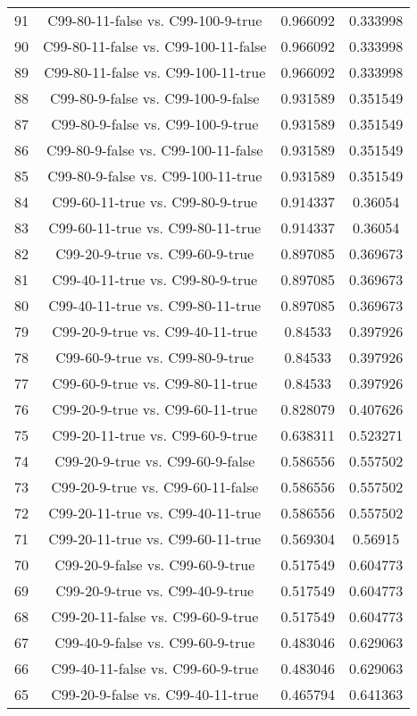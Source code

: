 \documentclass[a4paper,10pt]{article}
\begin{document}
\begin{landscape}
\begin{table}[!htp]
\begin{tabular}{cccc}
91&C99-80-11-false vs. C99-100-9-true&0.966092&0.333998\\
90&C99-80-11-false vs. C99-100-11-false&0.966092&0.333998\\
89&C99-80-11-false vs. C99-100-11-true&0.966092&0.333998\\
88&C99-80-9-false vs. C99-100-9-false&0.931589&0.351549\\
87&C99-80-9-false vs. C99-100-9-true&0.931589&0.351549\\
86&C99-80-9-false vs. C99-100-11-false&0.931589&0.351549\\
85&C99-80-9-false vs. C99-100-11-true&0.931589&0.351549\\
84&C99-60-11-true vs. C99-80-9-true&0.914337&0.36054\\
83&C99-60-11-true vs. C99-80-11-true&0.914337&0.36054\\
82&C99-20-9-true vs. C99-60-9-true&0.897085&0.369673\\
81&C99-40-11-true vs. C99-80-9-true&0.897085&0.369673\\
80&C99-40-11-true vs. C99-80-11-true&0.897085&0.369673\\
79&C99-20-9-true vs. C99-40-11-true&0.84533&0.397926\\
78&C99-60-9-true vs. C99-80-9-true&0.84533&0.397926\\
77&C99-60-9-true vs. C99-80-11-true&0.84533&0.397926\\
76&C99-20-9-true vs. C99-60-11-true&0.828079&0.407626\\
75&C99-20-11-true vs. C99-60-9-true&0.638311&0.523271\\
74&C99-20-9-true vs. C99-60-9-false&0.586556&0.557502\\
73&C99-20-9-true vs. C99-60-11-false&0.586556&0.557502\\
72&C99-20-11-true vs. C99-40-11-true&0.586556&0.557502\\
71&C99-20-11-true vs. C99-60-11-true&0.569304&0.56915\\
70&C99-20-9-false vs. C99-60-9-true&0.517549&0.604773\\
69&C99-20-9-true vs. C99-40-9-true&0.517549&0.604773\\
68&C99-20-11-false vs. C99-60-9-true&0.517549&0.604773\\
67&C99-40-9-false vs. C99-60-9-true&0.483046&0.629063\\
66&C99-40-11-false vs. C99-60-9-true&0.483046&0.629063\\
65&C99-20-9-false vs. C99-40-11-true&0.465794&0.641363\\

\end{tabular}
\end{table}
\end{landscape}
\end{document}
